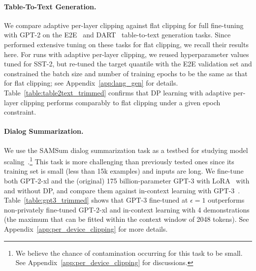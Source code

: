 
\paragraph{Table-To-Text Generation.}
We compare adaptive per-layer clipping against flat clipping for full fine-tuning with GPT-2 on the E2E~\citep{novikova2017e2e} and DART~\citep{nan2020dart} table-to-text generation tasks. 
Since~\cite{li2022large} performed extensive tuning on these tasks for flat clipping, we recall their results here.
For runs with adaptive per-layer clipping, we reused hyperparameter values tuned for SST-2, but re-tuned the target quantile with the E2E validation set and constrained the batch size and number of training epochs to be the same as that for flat clipping; see Appendix~\ref{app:lang_gen} for details.
Table~\ref{table:table2text_trimmed} confirms that DP learning with adaptive per-layer clipping performs comparably to flat clipping under a given epoch constraint.

\paragraph{Dialog Summarization.}\label{exp:summarization}
We use the SAMSum dialog summarization task as a testbed for studying model scaling~\citep{gliwa2019samsum}.\footnote{We believe the chance of contamination occurring for this task to be small. See Appendix~\ref{app:per_device_clipping} for discussions.}
This task is more challenging than previously tested ones since its training set is small (less than 15k examples) and inputs are long. 
We fine-tune both GPT-2-xl and the (original) 175 billion-parameter GPT-3 with LoRA~\citep{hu2021lora} with and without DP, and compare them against in-context learning with GPT-3~\citep{brown2020language}.
Table~\ref{table:gpt3_trimmed} shows that GPT-3 fine-tuned at $\epsilon=1$ outperforms non-privately fine-tuned GPT-2-xl and in-context learning with 4 demonstrations (the maximum that can be fitted within the context window of 2048 tokens). 
See Appendix~\ref{app:per_device_clipping} for more details.
